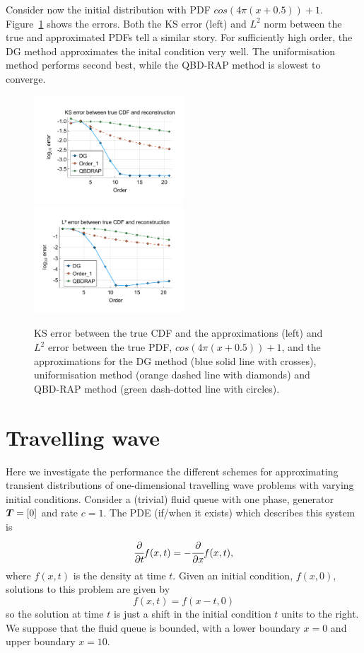 Consider now the initial distribution with PDF \(cos(4\pi(x+0.5))+1\). Figure~\ref{fig: fun 9 comp} shows the errors. Both the KS error (left) and \(L^2\) norm between the true and approximated PDFs tell a similar story. For sufficiently high order, the DG method approximates the inital condition very well. The uniformisation method performs second best, while the QBD-RAP method is slowest to converge. 
\begin{figure}
	\centering
	\includegraphics[width=0.5\textwidth,trim={1.25cm 0.8cm 0.25cm 1.25cm},clip]{chapter5/figs/comp/fun9/meshs_ks_error_formatted.pdf}%
	\includegraphics[width=0.5\textwidth,trim={1.25cm 0.8cm 0.25cm 1.25cm},clip]{chapter5/figs/comp/fun9/meshs_l2_pdf_error_formatted.pdf}
	\caption{KS error between the true CDF and the approximations (left) and \(L^2\) error between the true PDF, \(cos(4\pi(x+0.5))+1\), and the approximations for the DG method (blue solid line with crosses), uniformisation method (orange dashed line with diamonds) and QBD-RAP method (green dash-dotted line with circles).}
	\label{fig: fun 9 comp} 
\end{figure}
 
\FloatBarrier

\section{Travelling wave}
Here we investigate the performance the different schemes for approximating transient distributions of one-dimensional travelling wave problems with varying initial conditions. Consider a (trivial) fluid queue with one phase, generator \(\boldsymbol T=[0]\) and rate \(c=1\). The PDE (if/when it exists) which describes this system is 
\[\cfrac{\partial}{\partial t} f(x,t) = -\cfrac{\partial}{\partial x} f(x,t),\]
where \(f(x,t)\) is the density at time \(t\). Given an initial condition, \(f(x,0)\), solutions to this problem are given by 
\[f(x,t) = f(x-t,0)\]
so the solution at time \(t\) is just a shift in the initial condition \(t\) units to the right. We suppose that the fluid queue is bounded, with a lower boundary \(x=0\) and upper boundary \(x=10\). 

